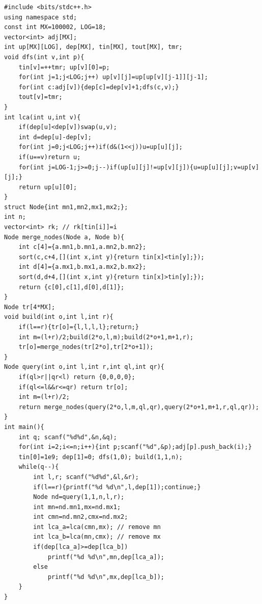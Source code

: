 \begin{lstlisting}[caption={CF 1062E: segment tree on tin + binary lifting LCA}, label={lst:c11-summit}]
#include <bits/stdc++.h>
using namespace std;
const int MX=100002, LOG=18;
vector<int> adj[MX];
int up[MX][LOG], dep[MX], tin[MX], tout[MX], tmr;
void dfs(int v,int p){
    tin[v]=++tmr; up[v][0]=p;
    for(int j=1;j<LOG;j++) up[v][j]=up[up[v][j-1]][j-1];
    for(int c:adj[v]){dep[c]=dep[v]+1;dfs(c,v);}
    tout[v]=tmr;
}
int lca(int u,int v){
    if(dep[u]<dep[v])swap(u,v);
    int d=dep[u]-dep[v];
    for(int j=0;j<LOG;j++)if(d&(1<<j))u=up[u][j];
    if(u==v)return u;
    for(int j=LOG-1;j>=0;j--)if(up[u][j]!=up[v][j]){u=up[u][j];v=up[v][j];}
    return up[u][0];
}
struct Node{int mn1,mn2,mx1,mx2;};
int n;
vector<int> rk; // rk[tin[i]]=i
Node merge_nodes(Node a, Node b){
    int c[4]={a.mn1,b.mn1,a.mn2,b.mn2};
    sort(c,c+4,[](int x,int y){return tin[x]<tin[y];});
    int d[4]={a.mx1,b.mx1,a.mx2,b.mx2};
    sort(d,d+4,[](int x,int y){return tin[x]>tin[y];});
    return {c[0],c[1],d[0],d[1]};
}
Node tr[4*MX];
void build(int o,int l,int r){
    if(l==r){tr[o]={l,l,l,l};return;}
    int m=(l+r)/2;build(2*o,l,m);build(2*o+1,m+1,r);
    tr[o]=merge_nodes(tr[2*o],tr[2*o+1]);
}
Node query(int o,int l,int r,int ql,int qr){
    if(ql>r||qr<l) return {0,0,0,0};
    if(ql<=l&&r<=qr) return tr[o];
    int m=(l+r)/2;
    return merge_nodes(query(2*o,l,m,ql,qr),query(2*o+1,m+1,r,ql,qr));
}
int main(){
    int q; scanf("%d%d",&n,&q);
    for(int i=2;i<=n;i++){int p;scanf("%d",&p);adj[p].push_back(i);}
    tin[0]=1e9; dep[1]=0; dfs(1,0); build(1,1,n);
    while(q--){
        int l,r; scanf("%d%d",&l,&r);
        if(l==r){printf("%d %d\n",l,dep[1]);continue;}
        Node nd=query(1,1,n,l,r);
        int mn=nd.mn1,mx=nd.mx1;
        int cmn=nd.mn2,cmx=nd.mx2;
        int lca_a=lca(cmn,mx); // remove mn
        int lca_b=lca(mn,cmx); // remove mx
        if(dep[lca_a]>=dep[lca_b])
            printf("%d %d\n",mn,dep[lca_a]);
        else
            printf("%d %d\n",mx,dep[lca_b]);
    }
}
\end{lstlisting}

